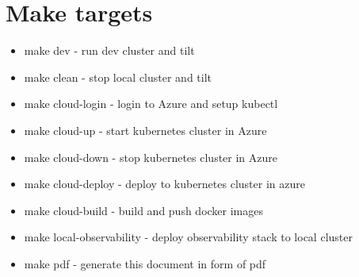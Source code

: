 \chapter{Make targets}
\label{sec:app_05}

\begin{itemize}
    \item make dev - run dev cluster and tilt
	\item make clean - stop local cluster and tilt
	\item make cloud-login - login to Azure and setup kubectl
	\item make cloud-up - start kubernetes cluster in Azure
	\item make cloud-down - stop kubernetes cluster in Azure
	\item make cloud-deploy - deploy to kubernetes cluster in azure
	\item make cloud-build - build and push docker images
	\item make local-observability - deploy observability stack to local cluster
	\item make pdf - generate this document in form of pdf
\end{itemize}